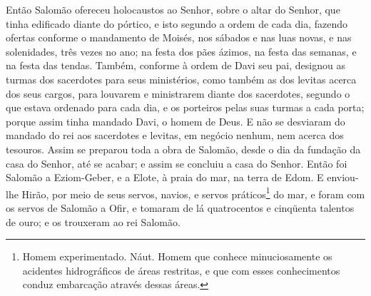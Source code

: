 Então Salomão ofereceu holocaustos ao Senhor, sobre o altar do
Senhor, que tinha edificado diante do pórtico, e isto segundo
a ordem de cada dia, fazendo ofertas conforme o mandamento de
Moisés, nos sábados e nas luas novas, e nas solenidades, três vezes
no ano; na festa dos pães ázimos, na festa das semanas, e na festa
das tendas. Também, conforme à ordem de Davi seu pai,
designou as turmas dos sacerdotes para seus ministérios, como também
as dos levitas acerca dos seus cargos, para louvarem e ministrarem
diante dos sacerdotes, segundo o que estava ordenado para cada dia,
e os porteiros pelas suas turmas a cada porta; porque assim tinha
mandado Davi, o homem de Deus. E não se desviaram do mandado
do rei aos sacerdotes e levitas, em negócio nenhum, nem acerca dos
tesouros. Assim se preparou toda a obra de Salomão, desde o
dia da fundação da casa do Senhor, até se acabar; e assim se
concluiu a casa do Senhor. Então foi Salomão a Eziom-Geber, e
a Elote, à praia do mar, na terra de Edom. E enviou-lhe
Hirão, por meio de seus servos, navios, e servos
práticos\footnote{Homem experimentado. Náut. Homem que conhece
minuciosamente os acidentes hidrográficos de áreas restritas, e que
com esses conhecimentos conduz embarcação através dessas áreas.} do
mar, e foram com os servos de Salomão a Ofir, e tomaram de lá
quatrocentos e cinqüenta talentos de ouro; e os trouxeram ao rei
Salomão.

\medskip

